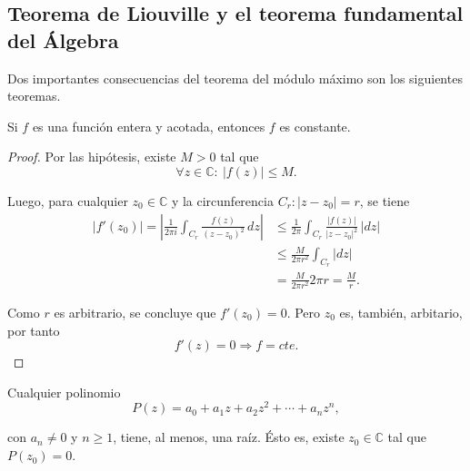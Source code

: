\subsection{Teorema de Liouville y el teorema fundamental del Álgebra} 

Dos importantes consecuencias del teorema del módulo máximo son los siguientes teoremas.

\begin{teorema}[de Liouville]
Si $f$ es una función entera y acotada, entonces $f$ es constante.
\end{teorema}

\begin{proof}
Por las hipótesis, existe $M > 0$ tal que
$$\forall z \in \mathbb{C}: ~ |f(z)| \leq M.$$

Luego, para cualquier $z_0 \in \mathbb{C}$ y la circunferencia $C_r: |z-z_0| = r$, se tiene
\begin{align*}
    |f'(z_0)| = \left|\frac{1}{2\pi i} \int_{C_r} \frac{f(z)}{(z-z_0)^2} \,dz \right| &\leq \frac{1}{2\pi} \int_{C_r} \frac{|f(z)|}{|z-z_0|^2} \,|dz| \\
    &\leq \frac{M}{2\pi r^2} \int_{C_r} |dz| \\
    &= \frac{M}{2\pi r^2} 2\pi r = \frac{M}{r}.
\end{align*}

Como $r$ es arbitrario, se concluye que $f'(z_0) = 0$. Pero $z_0$ es, también, arbitario, por tanto
$$f'(z) = 0 \Rightarrow f = cte.$$
\end{proof}

\begin{teorema}
Cualquier polinomio 
$$P(z) = a_0 + a_1 z + a_2 z^2 + \cdots + a_n z^n,$$

con $a_n \neq 0$ y $n\geq 1$, tiene, al menos, una raíz. Ésto es, existe $z_0 \in \mathbb{C}$ tal que $P(z_0) = 0$.
\end{teorema}

